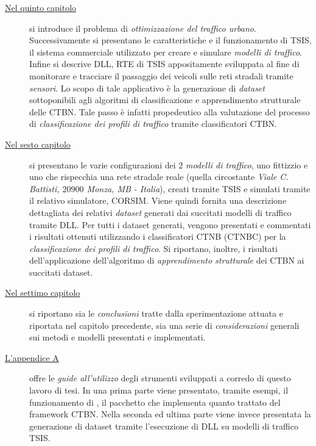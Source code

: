 \begin{description}
	\item[{\hyperref[cap:tsis-sensors]{Nel quinto capitolo}}]
	si introduce il problema di \emph{ottimizzazione del traffico urbano}. Successivamente si presentano le caratteristiche e il funzionamento di \acf{TSIS}, il sistema commerciale utilizzato per creare e simulare \emph{modelli di traffico}. Infine si descrive  \acs{DLL}, \acl{RTE} di \acs{TSIS} appositamente sviluppata al fine di monitorare e tracciare il passaggio dei veicoli sulle reti stradali tramite \emph{sensori}. Lo scopo di tale applicativo è la generazione di \emph{dataset} sottoponibili agli algoritmi di classificazione e apprendimento strutturale delle \acs{CTBN}. Tale passo è infatti propedeutico alla valutazione del processo di \emph{classificazione dei profili di traffico} tramite classificatori \acs{CTBN}.
	\item[{\hyperref[cap:esperimenti]{Nel sesto capitolo}}]
	si presentano le varie configurazioni dei $2$ \emph{modelli di traffico}, uno fittizzio e uno che rispecchia una rete stradale reale (quella circostante \emph{Viale C. Battisti, $20900$ Monza, MB - Italia}), creati tramite \acs{TSIS} e simulati tramite il relativo simulatore, \acs{CORSIM}. Viene quindi fornita una descrizione dettagliata dei relativi \emph{dataset} generati dai succitati modelli di traffico tramite  \acs{DLL}. Per tutti i dataset generati, vengono presentati e commentati i risultati ottenuti utilizzando i classificatori \acs{CTNB} (\acs{CTNBC}) per la \emph{classificazione dei profili di traffico}. Si riportano, inoltre, i risultati dell'applicazione dell'algoritmo di \emph{apprendimento strutturale} dei \acs{CTBN} ai succitati dataset.
	\item[{\hyperref[cap:concl]{Nel settimo capitolo}}]
	si riportano sia le \emph{conclusioni} tratte dalla sperimentazione attuata e riportata nel capitolo precedente, sia una serie di \emph{considerazioni} generali sui metodi e modelli presentati e implementati.
	\item[{\hyperref[cap:guide]{L'appendice A}}]
	offre le \emph{guide all'utilizzo} degli strumenti sviluppati a corredo di questo lavoro di tesi. In una prima parte viene presentato, tramite esempi, il funzionamento di , il pacchetto  che implementa quanto trattato del framework \acs{CTBN}. Nella seconda ed ultima parte viene invece presentata la generazione di dataset tramite l'esecuzione di  \acs{DLL} su modelli di traffico \acs{TSIS}.
\end{description}



